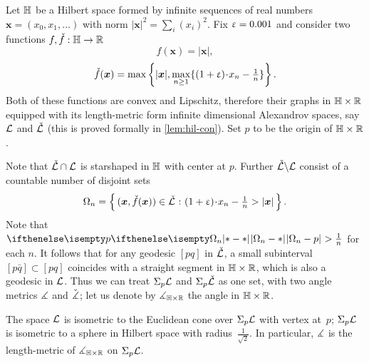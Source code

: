 Let $\mathbb{H}$ be a Hilbert space formed by infinite sequences of real numbers $\bm{x}=(x_0,x_1,\dots)$ with norm
$|\bm{x}|^2=\sum_i(x_i)^2$. 
Fix $\upvarepsilon=0.001$ and consider two functions $f,\check f:\HH\to\RR$
\[f(\bm{x})=|\bm{x}|,\]
\[\check f(\bm{x})
=
\max\left\{|\bm{x}|,\max_{n\ge1}\{(1+\eps)\cdot x_n-\tfrac{1}{n}\}\right\}.\] 
Both of these functions are convex and Lipschitz, therefore their graphs in $\HH\times \RR$ equipped with its length-metric form infinite dimensional Alexandrov spaces, say $\mathcal{L}$  and $\check{\mathcal{L}}$ (this is proved formally in \ref{lem:hil-con}).
Set $p$ to be the origin of $\HH\times \RR$.

Note that $\check{\spc{L}}\cap\spc{L}$ is starshaped in $\mathbb{H}$ with center at $p$.
Further $\check{\mathcal{L}}\backslash\mathcal{L}$ consist of a countable number of disjoint sets
\[\Omega_n=\set{(\bm{x},\check f(\bm{x}))\in\check{\spc{L}}}{(1+\eps)\cdot x_n-\tfrac{1}{n}>|\bm{x}|}.\]
Note that $\dist{\Omega_n}{p}{}>\tfrac{1}{n}$ for each $n$.
It follows that for any geodesic $[p q]$ in $\check{\mathcal{L}}$,
a small subinterval $[p \bar q]\subset [p q]$ 
coincides with a straight segment in $\HH\times\RR$, 
which is also a geodesic in $\mathcal{L}$.
Thus we can treat $\Sigma_p\mathcal{L}$ and $\Sigma_p\check{\mathcal{L}}$ as one set, with two angle metrics $\measuredangle$ and $\check{\measuredangle}$;
let us denote by $\mangle_{\HH\times \RR}$ the angle in $\HH\times\RR$.

The space $\mathcal{L}$  is isometric to the Euclidean cone
over $\Sigma_p\mathcal{L}$ with vertex at~$p$; 
$\Sigma_p\mathcal{L}$ is isometric to a sphere in Hilbert space with radius~$\frac{1}{\sqrt{2}}$.
In particular, $\measuredangle$ is the length-metric of $\mangle_{\HH\times\RR}$ on $\Sigma_p{\mathcal{L}}$.

